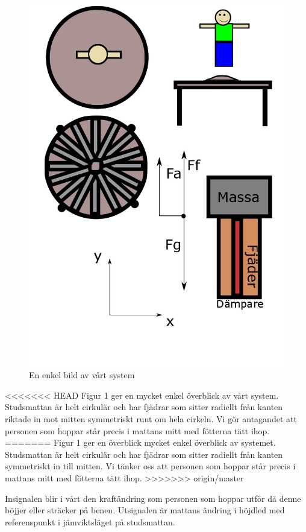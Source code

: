 \documentclass[10pt,a4paper]{article}
\begin{document}
\begin{figure}[ht]
\caption{En enkel bild av vårt system}
\includegraphics[scale=0.4]{Bild}
\end{figure}
\clearpage

<<<<<<< HEAD
Figur 1 ger en mycket enkel överblick av vårt system. Studsmattan är helt cirkulär och har fjädrar som sitter radiellt från kanten riktade in mot mitten symmetriskt runt om hela cirkeln. Vi gör antagandet att personen som hoppar står precis i mattans mitt med fötterna tätt ihop.
=======
Figur 1 ger en överblick mycket enkel överblick av systemet. Studsmattan är helt cirkulär och har fjädrar som sitter radiellt från kanten symmetriskt in till mitten. Vi tänker oss att personen som hoppar står precis i mattans mitt med fötterna tätt ihop.
>>>>>>> origin/master

Insignalen blir i vårt den kraftändring som personen som hoppar utför då denne böjjer eller sträcker på benen. Utsignalen är mattans ändring i höjdled med referenspunkt i jämviktsläget på studsmattan.
\end{document}
